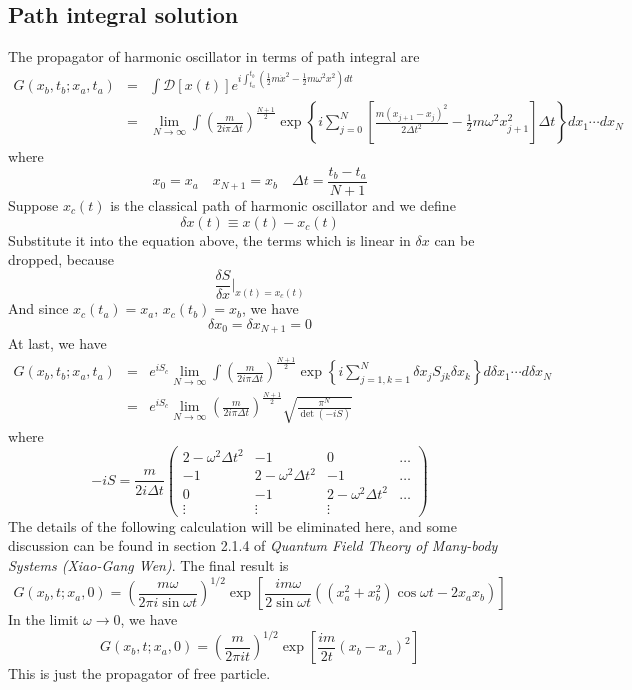 \subsection{Path integral solution}
The propagator of harmonic oscillator in terms of path integral are
\begin{eqnarray}
G(x_b,t_b;x_a,t_a) &=& \int \mathcal{D}[x(t)] e^{i\int_{t_a}^{t_b} (\frac{1}{2}m\dot{x}^2 - \frac{1}{2}m\omega^2 x^2)dt} \nonumber \\
&=& \lim_{N \to \infty} \int \left(\frac{m}{2i\pi\Delta t}\right)^{\frac{N+1}{2}} \exp \left\{ i \sum_{j=0}^{N}\left[ \frac{m(x_{j+1}-x_{j})^2}{2\Delta t^2}   - \frac{1}{2}m\omega^2 x_{j+1}^2 \right] \Delta t \right\} dx_1 \cdots dx_N \nonumber
\end{eqnarray}
where
\[x_0 = x_a \quad x_{N+1} = x_b \quad \Delta t = \frac{t_b-t_a}{N+1}\]
Suppose $x_c(t)$ is the classical path of harmonic oscillator and we define
\[\delta x(t) \equiv x(t) - x_c(t)\]
Substitute it into the equation above, the terms which is linear in $\delta x$ can be dropped, because
\[\frac{\delta S}{\delta x} |_{x(t) = x_c(t)}\]
And since $x_c(t_a) = x_a$, $x_c(t_b) = x_b$, we have
\[\delta x_{0} = \delta x_{N+1} = 0\]
At last, we have
\begin{eqnarray}
G(x_b,t_b;x_a,t_a) &=& e^{iS_c} \lim_{N \to \infty} \int \left(\frac{m}{2i\pi\Delta t}\right)^{\frac{N+1}{2}} \exp \left\{ i \sum_{j=1,k=1}^{N} \delta x_j S_{jk} \delta x_k\right\} d\delta x_1 \cdots d\delta x_N \nonumber \\
&=& e^{iS_c} \lim_{N \to \infty} \left(\frac{m}{2i\pi\Delta t}\right)^{\frac{N+1}{2}} \sqrt{\frac{\pi^N}{\det (-iS)}}
\end{eqnarray}
where
\[-iS = \frac{m}{2i\Delta t} \left( \begin{matrix} 2-\omega^2\Delta t^2 & -1& 0& \ldots \\ -1& 2-\omega^2\Delta t^2& -1& \ldots \\ 0& -1& 2-\omega^2\Delta t^2& \ldots \\ \vdots & \vdots & \vdots & \end{matrix} \right)\]
The details of the following calculation will be eliminated here, and some discussion can be found in section 2.1.4 of \emph{Quantum Field Theory of Many-body Systems (Xiao-Gang Wen)}. The final result is\\
\[G(x_b,t;x_a,0) = \left ( \frac{m\omega}{2\pi i \sin \omega t} \right )^{1/2}\exp \left [ \frac{im\omega}{2\sin\omega t} \left ((x_a^2 + x_b^2)\cos\omega t - 2x_a x_b  \right ) \right ]\]
In the limit $\omega \to 0$, we have
\[G(x_b,t;x_a,0) = \left ( \frac{m}{2\pi i t} \right )^{1/2}\exp \left [ \frac{im}{2t} \left ( x_b-x_a\right)^2 \right ]\]
This is just the propagator of free particle.


